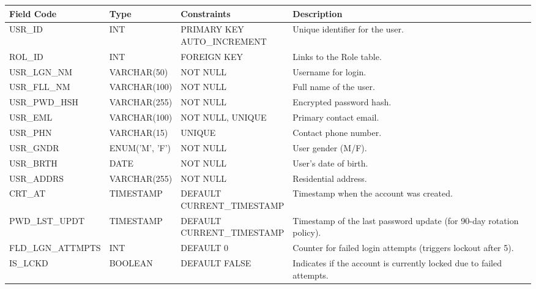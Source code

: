\begin{table}[H]
	\centering
	\small
	\renewcommand{\arraystretch}{1.5}
	\begin{tabularx}{\textwidth}{l l l X}
		\toprule
		\rowcolor[gray]{0.9} \textbf{Field Code} & \textbf{Type} & \textbf{Constraints} & \textbf{Description} \\
		\midrule
		USR\_ID        & INT           & \makecell[l]{PRIMARY KEY \\ AUTO\_INCREMENT}   & Unique identifier for the user. \\
		ROL\_ID        & INT           & FOREIGN KEY                 & Links to the Role table. \\
		USR\_LGN\_NM  & VARCHAR(50)   & NOT NULL                    & Username for login. \\
		USR\_FLL\_NM  & VARCHAR(100)  & NOT NULL                    & Full name of the user. \\
		USR\_PWD\_HSH & VARCHAR(255)  & NOT NULL                    & Encrypted password hash. \\
		USR\_EML      & VARCHAR(100)  & NOT NULL, UNIQUE            & Primary contact email. \\
		USR\_PHN      & VARCHAR(15)   & UNIQUE                      & Contact phone number. \\
		USR\_GNDR     & ENUM('M', 'F')& NOT NULL                    & User gender (M/F). \\
		USR\_BRTH     & DATE          & NOT NULL                    & User's date of birth. \\
		USR\_ADDRS    & VARCHAR(255)  & NOT NULL                    & Residential address. \\
		CRT\_AT       & TIMESTAMP     & \makecell[l]{DEFAULT \\ CURRENT\_TIMESTAMP} & Timestamp when the account was created. \\
		PWD\_LST\_UPDT& TIMESTAMP     & \makecell[l]{DEFAULT \\ CURRENT\_TIMESTAMP} & Timestamp of the last password update (for 90-day rotation policy). \\
		FLD\_LGN\_ATTMPTS & INT       & DEFAULT 0                   & Counter for failed login attempts (triggers lockout after 5). \\
		IS\_LCKD      & BOOLEAN       & DEFAULT FALSE               & Indicates if the account is currently locked due to failed attempts. \\
		\bottomrule
	\end{tabularx}
\end{table}

